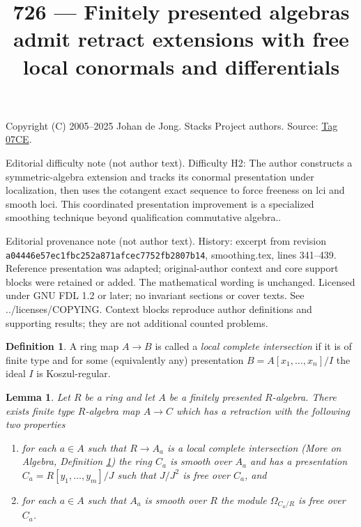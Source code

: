 \documentclass{amsart}
\theoremstyle{plain}
\newtheorem{lemma}[subsection]{Lemma}
\theoremstyle{definition}
\newtheorem{definition}[subsection]{Definition}
\theoremstyle{remark}
\numberwithin{equation}{subsection}
\begin{document}
\title[Stacks Project, Tag 07CE]{726 --- Finitely presented algebras admit retract extensions with free local conormals and differentials}
\maketitle
\noindent Copyright (C) 2005--2025 Johan de Jong. Stacks Project authors. Source: \href{https://stacks.math.columbia.edu/tag/07CE}{Tag 07CE}.

\noindent Editorial difficulty note (not author text). Difficulty H2: The author constructs a symmetric-algebra extension and tracks its conormal presentation under localization, then uses the cotangent exact sequence to force freeness on lci and smooth loci. This coordinated presentation improvement is a specialized smoothing technique beyond qualification commutative algebra..

\noindent Editorial provenance note (not author text). History: excerpt from revision \texttt{a0444\allowbreak 6e57e\allowbreak c1fbc\allowbreak 252a8\allowbreak 71afc\allowbreak ec775\allowbreak 2fb28\allowbreak 07b14}, smoothing.tex, lines 341--439. Reference presentation was adapted; original-author context and core support blocks were retained or added. The mathematical wording is unchanged. Licensed under GNU FDL 1.2 or later; no invariant sections or cover texts. See ../licenses/COPYING. Context blocks reproduce author definitions and supporting results; they are not additional counted problems.

\begin{definition}
\label{more-algebra-definition-local-complete-intersection}
A ring map $A \to B$ is called a {\it local complete intersection}
if it is of finite type and for some (equivalently any) presentation
$B = A[x_1, \ldots, x_n]/I$ the ideal $I$ is Koszul-regular.
\end{definition}

\begin{lemma}
\label{lemma-improve-presentation}
Let $R$ be a ring and let $A$ be a finitely presented $R$-algebra.
There exists finite type $R$-algebra map $A \to C$ which has a
retraction with the following two properties
\begin{enumerate}
\item for each $a \in A$ such that $R \to A_a$ is a local complete
intersection (More on Algebra, Definition
\ref{more-algebra-definition-local-complete-intersection})
the ring $C_a$ is smooth over $A_a$ and has a presentation
$C_a = R[y_1, \ldots, y_m]/J$ such that $J/J^2$ is free over $C_a$, and
\item for each $a \in A$ such that $A_a$ is smooth over $R$ the
module $\Omega_{C_a/R}$ is free over $C_a$.
\end{enumerate}
\end{lemma}
\end{document}
